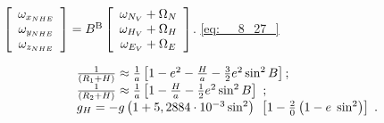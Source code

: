 $\left[\begin{array}{c} {\omega_{x_{NHE} } } \\ {\omega_{y_{NHE} } } \\ {\omega 
_{z_{NHE} } } \end{array}\right]=B^{{\rm B}} \left[\begin{array}{c} {\omega_{N_{V} 
} +\Omega_{N} } \\ {\omega_{H_{V} } +\Omega_{H} } \\ {\omega_{E_{V} } +\Omega 
_{E} } \end{array}\right]$.                                           \eqref{eq:__8_27_}



\begin{equation} 
\label{eq:__8_28_} \begin{array}{l} {\frac{1}{(R_{1} +H)} \approx \frac{1}{a} 
\left[1-e^{2} -\frac{H}{a} -\frac{3}{2} e^{2} \sin ^{2} B\right];} \\ {\frac{1}{(R_{{
\rm 2}} +H)} \approx \frac{1}{a} \left[1-\frac{H}{a} -\frac{1}{2} e^{2} \sin ^{2} 
B\right]\, \, ;} \\ {g_{H} =-g\left(1+5,2884\cdot 10^{-3} \sin ^{2} \right){\rm \; 
}\left[1-\frac{2}{0} \left(1-e{\rm \; }\sin ^{2} \right)\right]{\rm \; .}} \end{array} 
\end{equation} 








